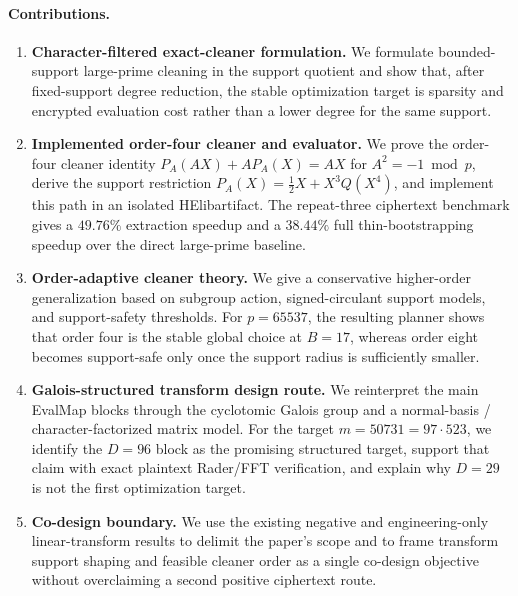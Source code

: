 \documentclass[a4paper,runningheads]{llncs}
\newcommand{\HElib}{\textsf{HElib}}
\begin{document}
\paragraph{Contributions.}
\begin{enumerate}[leftmargin=*,label=\textbf{\arabic*.}]
  \item \textbf{Character-filtered exact-cleaner formulation.}
  We formulate bounded-support large-prime cleaning in the support quotient and show that, after fixed-support degree reduction, the stable optimization target is sparsity and encrypted evaluation cost rather than a lower degree for the same support.

  \item \textbf{Implemented order-four cleaner and evaluator.}
  We prove the order-four cleaner identity $P_A(AX)+AP_A(X)=AX$ for $A^2=-1\bmod p$, derive the support restriction $P_A(X)=\frac12X+X^3Q(X^4)$, and implement this path in an isolated \HElib artifact. The repeat-three ciphertext benchmark gives a $49.76\%$ extraction speedup and a $38.44\%$ full thin-bootstrapping speedup over the direct large-prime baseline.

  \item \textbf{Order-adaptive cleaner theory.}
  We give a conservative higher-order generalization based on subgroup action, signed-circulant support models, and support-safety thresholds. For $p=65537$, the resulting planner shows that order four is the stable global choice at $B=17$, whereas order eight becomes support-safe only once the support radius is sufficiently smaller.

  \item \textbf{Galois-structured transform design route.}
  We reinterpret the main EvalMap blocks through the cyclotomic Galois group and a normal-basis / character-factorized matrix model. For the target $m=50731=97\cdot523$, we identify the $D=96$ block as the promising structured target, support that claim with exact plaintext Rader/FFT verification, and explain why $D=29$ is not the first optimization target.

  \item \textbf{Co-design boundary.}
  We use the existing negative and engineering-only linear-transform results to delimit the paper's scope and to frame transform support shaping and feasible cleaner order as a single co-design objective without overclaiming a second positive ciphertext route.
\end{enumerate}
\end{document}
